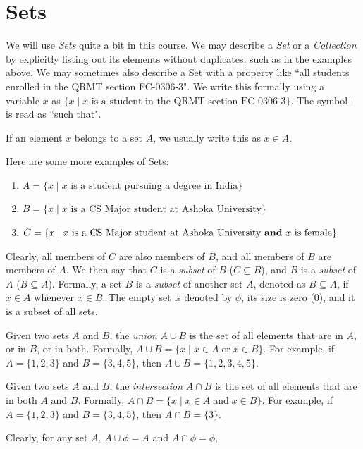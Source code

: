 \section{Sets}
\label{sec:sets}
We will use {\em Sets} quite a bit in this course. We may describe a {\em Set} or a {\em Collection} by explicitly listing out its elements without duplicates, such as in the examples above. We may sometimes also describe a Set with a property like ``all students enrolled in the QRMT section FC-0306-3". We write this formally using a variable $x$ as $\{x \mid \mbox{$x$ is a student in the QRMT section FC-0306-3}\}$. The symbol $\mid$ is read as ``such that". 

If an element $x$ belongs to a set $A$, we usually write this as $x \in A$.

Here are some more examples of Sets:
\begin{enumerate}
\item $A = \{x \mid \mbox{$x$ is a student pursuing a degree in India}\}$
\item $B = \{x \mid  \mbox{$x$ is a CS Major student at Ashoka University}\}$
\item $C = \{x \mid \mbox{$x$ is a CS Major student at Ashoka University {\bf and} $x$ is female}\}$
\end{enumerate}

Clearly, all members of $C$ are also members of $B$, and all members of $B$ are members of $A$. We then say that $C$ is a {\em subset} of $B$  ($C \subseteq B$), and  $B$ is a {\em subset} of $A$ ($B \subseteq A$).  Formally, a set $B$ is a {\em subset} of another set $A$, denoted as $B \subseteq A$, if
$x \in A$ whenever $x \in B$. The empty set is denoted by $\phi$, its size is zero (0), and it is a subset of all sets.


Given two sets $A$ and $B$, the {\em union} $A \cup B$ is the set of all elements that are in $A$, or in $B$, or in both. Formally, $A \cup B = \{ x \mid x \in A \; \text{or} \; x \in B \}$. For example, if $A = \{1, 2, 3\}$ and $B = \{3, 4, 5\}$, then  $A \cup B = \{1, 2, 3, 4, 5\}$.

Given two sets $A$ and $B$, the {\em intersection} $A \cap B$ is the set of all elements that are in both  $A$ and $B$. Formally, 
$A \cap B = \{ x \mid x \in A \; \text{and} \; x \in B \}$. For example, if  $A = \{1, 2, 3\}$ and  $B = \{3, 4, 5\}$, then  $A \cap B = \{3\}$.

Clearly, for any set $A$, $A \cup \phi = A$ and $A \cap \phi = \phi$,


